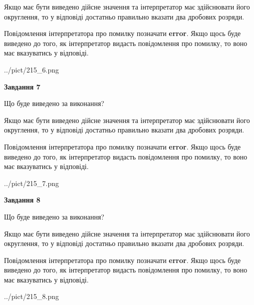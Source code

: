 \documentclass[12pt, ukrainian]{article}
\begin{document}
{\begin {Large}
Якщо має бути виведено дійсне значення та інтерпретатор має здійснювати його округлення, 
то у відповіді достатньо правильно вказати два дробових розряди.

Повідомлення інтерпретатора про помилку позначати \textbf{error}.
Якщо щось буде виведено до того, як інтерпретатор видасть повідомлення про помилку, 
то воно має вказуватись у відповіді. \par

\begin{center}
	{../pict/215_6.png}
\end{center}
\newpage

{\begin {center}\textbf{Завдання 7}\end {center}}\par
Що буде виведено за виконання? \par

Якщо має бути виведено дійсне значення та інтерпретатор має здійснювати його округлення, 
то у відповіді достатньо правильно вказати два дробових розряди.

Повідомлення інтерпретатора про помилку позначати \textbf{error}.
Якщо щось буде виведено до того, як інтерпретатор видасть повідомлення про помилку, 
то воно має вказуватись у відповіді. \par

\begin{center}
	{../pict/215_7.png}
\end{center}
\newpage

{\begin {center}\textbf{Завдання 8}\end {center}}\par
Що буде виведено за виконання? \par

Якщо має бути виведено дійсне значення та інтерпретатор має здійснювати його округлення, 
то у відповіді достатньо правильно вказати два дробових розряди.

Повідомлення інтерпретатора про помилку позначати \textbf{error}.
Якщо щось буде виведено до того, як інтерпретатор видасть повідомлення про помилку, 
то воно має вказуватись у відповіді. \par

\begin{center}
	{../pict/215_8.png}
\end{center}
\newpage


\end{Large}}
\end{document}
